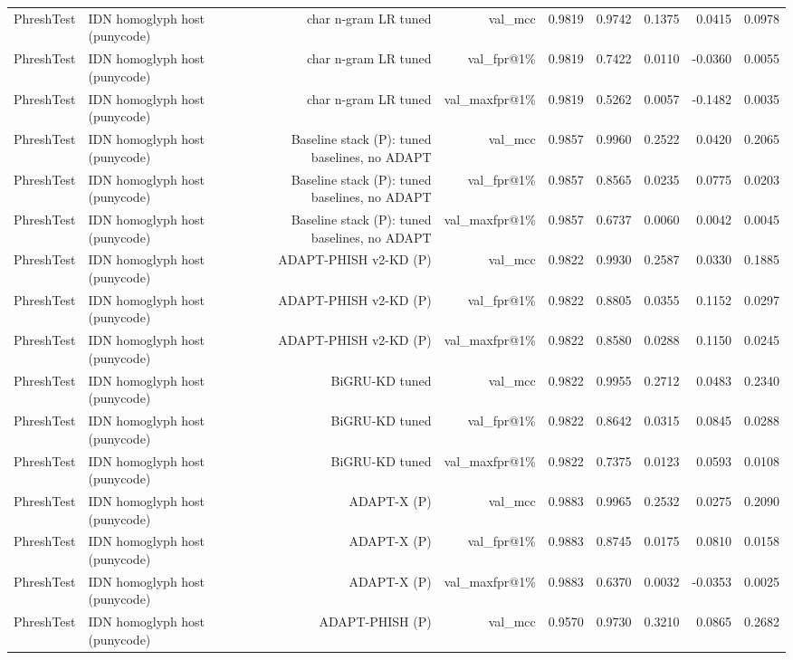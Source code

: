 \begin{table}[t]
\begin{tabular}{llrrrrrrr}
PhreshTest & IDN homoglyph host (punycode) & char n-gram LR tuned & val\_mcc & 0.9819 & 0.9742 & 0.1375 & 0.0415 & 0.0978 \\
PhreshTest & IDN homoglyph host (punycode) & char n-gram LR tuned & val\_fpr@1\% & 0.9819 & 0.7422 & 0.0110 & -0.0360 & 0.0055 \\
PhreshTest & IDN homoglyph host (punycode) & char n-gram LR tuned & val\_maxfpr@1\% & 0.9819 & 0.5262 & 0.0057 & -0.1482 & 0.0035 \\
PhreshTest & IDN homoglyph host (punycode) & Baseline stack (P): tuned baselines, no ADAPT & val\_mcc & 0.9857 & 0.9960 & 0.2522 & 0.0420 & 0.2065 \\
PhreshTest & IDN homoglyph host (punycode) & Baseline stack (P): tuned baselines, no ADAPT & val\_fpr@1\% & 0.9857 & 0.8565 & 0.0235 & 0.0775 & 0.0203 \\
PhreshTest & IDN homoglyph host (punycode) & Baseline stack (P): tuned baselines, no ADAPT & val\_maxfpr@1\% & 0.9857 & 0.6737 & 0.0060 & 0.0042 & 0.0045 \\
PhreshTest & IDN homoglyph host (punycode) & ADAPT-PHISH v2-KD (P) & val\_mcc & 0.9822 & 0.9930 & 0.2587 & 0.0330 & 0.1885 \\
PhreshTest & IDN homoglyph host (punycode) & ADAPT-PHISH v2-KD (P) & val\_fpr@1\% & 0.9822 & 0.8805 & 0.0355 & 0.1152 & 0.0297 \\
PhreshTest & IDN homoglyph host (punycode) & ADAPT-PHISH v2-KD (P) & val\_maxfpr@1\% & 0.9822 & 0.8580 & 0.0288 & 0.1150 & 0.0245 \\
PhreshTest & IDN homoglyph host (punycode) & BiGRU-KD tuned & val\_mcc & 0.9822 & 0.9955 & 0.2712 & 0.0483 & 0.2340 \\
PhreshTest & IDN homoglyph host (punycode) & BiGRU-KD tuned & val\_fpr@1\% & 0.9822 & 0.8642 & 0.0315 & 0.0845 & 0.0288 \\
PhreshTest & IDN homoglyph host (punycode) & BiGRU-KD tuned & val\_maxfpr@1\% & 0.9822 & 0.7375 & 0.0123 & 0.0593 & 0.0108 \\
PhreshTest & IDN homoglyph host (punycode) & ADAPT-X (P) & val\_mcc & 0.9883 & 0.9965 & 0.2532 & 0.0275 & 0.2090 \\
PhreshTest & IDN homoglyph host (punycode) & ADAPT-X (P) & val\_fpr@1\% & 0.9883 & 0.8745 & 0.0175 & 0.0810 & 0.0158 \\
PhreshTest & IDN homoglyph host (punycode) & ADAPT-X (P) & val\_maxfpr@1\% & 0.9883 & 0.6370 & 0.0032 & -0.0353 & 0.0025 \\
PhreshTest & IDN homoglyph host (punycode) & ADAPT-PHISH (P) & val\_mcc & 0.9570 & 0.9730 & 0.3210 & 0.0865 & 0.2682 \\

\end{tabular}
\end{table}
